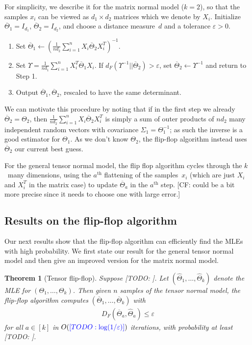 \documentclass[aos]{imsart}
\newtheorem{theorem}{Theorem}[section]
\theoremstyle{definition}
\numberwithin{equation}{section}
\newcommand{\eps}{\varepsilon}
\newcommand{\samp}{x}
\newcommand{\CF}[1]{{\color{purple}[CF: #1]}}
\newcommand{\TODO}[1]{{\color{blue}[TODO: #1]}}
\begin{document}
For simplicity, we describe it for the matrix normal model ($k=2$), so that the samples $\samp_i$ can be viewed as $d_1\times d_2$ matrices which we denote by $X_i$.
Initialize $\overline{\Theta}_1 = I_{d_1}$, $\overline{\Theta}_2 = I_{d_2}$, and choose a distance measure~$d$ and a tolerance $\eps > 0$.
\begin{enumerate}
\item Set $\overline{\Theta}_1 \leftarrow (\frac{1}{n d_2} \sum_{i = 1}^n X_i \overline{\Theta}_2 X_i^T)^{-1}.$
\item Set $\Upsilon = \frac{1}{n d_1} \sum_{i = 1}^n X_i^T \overline{\Theta}_1 X_i$.
If $d_F( \Upsilon^{-1}|| \overline{\Theta}_2) > \eps$, set $\overline{\Theta}_2 \leftarrow \Upsilon^{-1}$ and return to Step 1.
\item Output $\overline{\Theta}_1, \overline{\Theta}_2$, rescaled to have the same determinant.
\end{enumerate}

We can motivate this procedure by noting that if in the first step we already $\overline{\Theta}_2 = \Theta_2$, then $\frac{1}{n d_2} \sum_{i = 1}^n X_i \overline{\Theta}_2 X_i^T$ is simply a sum of outer products of $nd_2$ many independent random vectors with covariance $\Sigma_1 = \Theta_1^{-1}$; as such the inverse is a good estimator for $\Theta_1$.
As we don't know $\Theta_2$, the flip-flop algorithm instead uses $\overline{\Theta}_2$ our current best guess.

For the general tensor normal model, the flip flop algorithm cycles through the $k$~many dimensions, using the $a^\text{th}$ flattening of the samples~$x_i$ (which are just $X_i$ and $X_i^T$ in the matrix case) to update $\overline{\Theta}_a$ in the $a^\text{th}$ step. \CF{could be a bit more precise since it needs to choose one with large error.}

\subsection{Results on the flip-flop algorithm}
Our next results show that the flip-flop algorithm can efficiently find the MLEs with high probability.
We first state our result for the general tensor normal model and then give an improved version for the matrix normal model.

\begin{theorem}[Tensor flip-flop]\label{thm:tensor-flipflop}
Suppose \TODO{}.
Let $(\widehat{\Theta}_1,\dots,\widehat{\Theta}_k)$ denote the MLE for $(\Theta_1,\dots,\Theta_k)$.
Then given $n$ samples of the tensor normal model, the flip-flop algorithm computes $(\overline{\Theta}_1,\dots,\overline{\Theta}_k)$ with
\begin{align*}
  D_F(\overline{\Theta}_a, \widehat{\Theta}_a) \leq \eps
\end{align*}
for all $a\in[k]$ in $O(\TODO{\log(1/\eps)})$ iterations, with probability at least \TODO{}.
\end{theorem}
\end{document}
